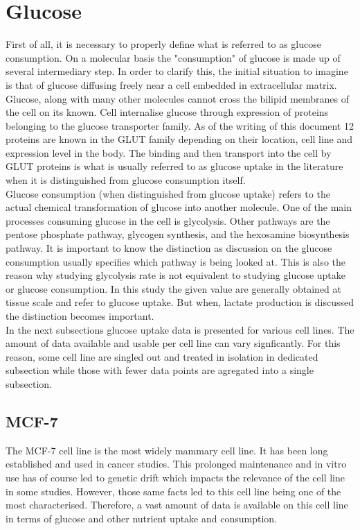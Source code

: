 \documentclass[11pt,a4paper]{article}
\begin{document}
\section{Glucose}
First of all, it is necessary to properly define what is referred to as glucose consumption. On a molecular basis the "consumption" of glucose is made up of several intermediary step. In order to clarify this, the initial situation to imagine is that of glucose diffusing freely near a cell embedded in extracellular matrix. Glucose, along with many other molecules cannot cross the bilipid membranes of the cell on its known. Cell internalise glucose through expression of proteins belonging to the glucose transporter family. As of the writing of this document 12 proteins are known in the GLUT family depending on their location, cell line and expression level in the body. The binding and then transport into the cell by GLUT proteins is what is usually referred to as glucose uptake in the literature when it is distinguished from glucose consumption itself.\cite{Berg2006}\\

Glucose consumption (when distinguished from glucose uptake) refers to the actual chemical transformation of glucose into another molecule. One of the main processes consuming glucose in the cell is glycolysis. Other pathways are the pentose phosphate pathway, glycogen synthesis, and the hexosamine biosynthesis pathway.\cite{Bouche2004} It is important to know the distinction as discussion on the glucose consumption usually specifies which pathway is being looked at. This is also the reason why studying glycolysis rate is not equivalent to studying glucose uptake or glucose consumption. In this study the given value are generally obtained at tissue scale and refer to glucose uptake. But when, lactate production is discussed the distinction becomes important.\\

In the next subsections glucose uptake data is presented for various cell lines. The amount of data available and usable per cell line can vary signficantly. For this reason, some cell line are singled out and treated in isolation in dedicated subsection while those with fewer data points are agregated into a single subsection.


\subsection{MCF-7}
The MCF-7 cell line is the most widely mammary cell line. It has been long established and used in cancer studies. This prolonged maintenance and in vitro use has of course led to genetic drift which impacts the relevance of the cell line in some studies. However, those same facts led to this cell line being one of the most characterised. Therefore, a vast amount of data is available on this cell line in terms of glucose and other nutrient uptake and consumption.\\
\end{document}
